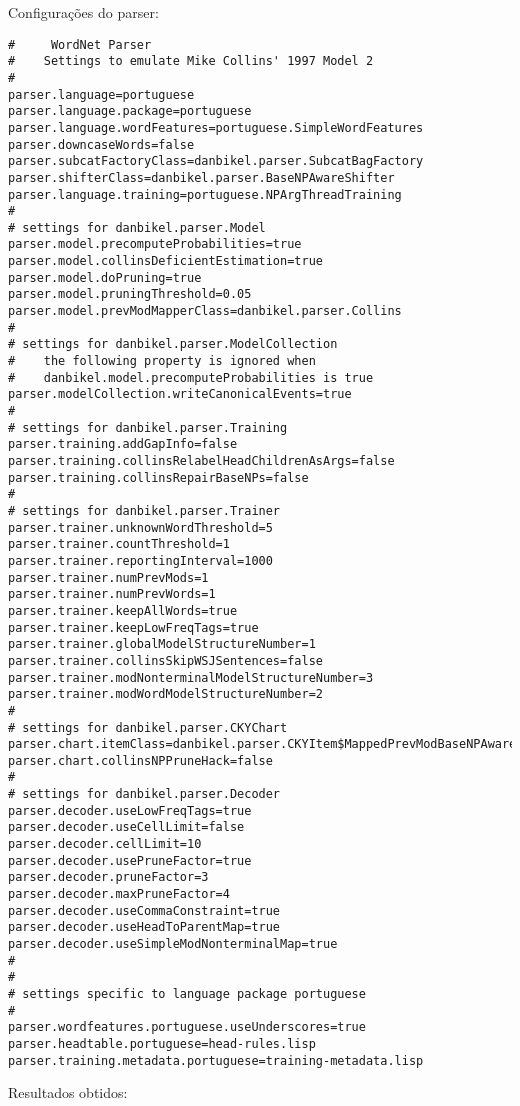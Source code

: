 \normalsize

Configurações do parser:

\scriptsize
\begin{verbatim}
#     WordNet Parser
#    Settings to emulate Mike Collins' 1997 Model 2
#
parser.language=portuguese
parser.language.package=portuguese
parser.language.wordFeatures=portuguese.SimpleWordFeatures
parser.downcaseWords=false
parser.subcatFactoryClass=danbikel.parser.SubcatBagFactory
parser.shifterClass=danbikel.parser.BaseNPAwareShifter
parser.language.training=portuguese.NPArgThreadTraining
#
# settings for danbikel.parser.Model
parser.model.precomputeProbabilities=true
parser.model.collinsDeficientEstimation=true
parser.model.doPruning=true
parser.model.pruningThreshold=0.05
parser.model.prevModMapperClass=danbikel.parser.Collins
#
# settings for danbikel.parser.ModelCollection
#    the following property is ignored when
#    danbikel.model.precomputeProbabilities is true
parser.modelCollection.writeCanonicalEvents=true
#
# settings for danbikel.parser.Training
parser.training.addGapInfo=false
parser.training.collinsRelabelHeadChildrenAsArgs=false
parser.training.collinsRepairBaseNPs=false
#
# settings for danbikel.parser.Trainer
parser.trainer.unknownWordThreshold=5
parser.trainer.countThreshold=1
parser.trainer.reportingInterval=1000
parser.trainer.numPrevMods=1
parser.trainer.numPrevWords=1
parser.trainer.keepAllWords=true
parser.trainer.keepLowFreqTags=true
parser.trainer.globalModelStructureNumber=1
parser.trainer.collinsSkipWSJSentences=false
parser.trainer.modNonterminalModelStructureNumber=3
parser.trainer.modWordModelStructureNumber=2
#
# settings for danbikel.parser.CKYChart
parser.chart.itemClass=danbikel.parser.CKYItem$MappedPrevModBaseNPAware
parser.chart.collinsNPPruneHack=false
#
# settings for danbikel.parser.Decoder
parser.decoder.useLowFreqTags=true
parser.decoder.useCellLimit=false
parser.decoder.cellLimit=10
parser.decoder.usePruneFactor=true
parser.decoder.pruneFactor=3
parser.decoder.maxPruneFactor=4
parser.decoder.useCommaConstraint=true
parser.decoder.useHeadToParentMap=true
parser.decoder.useSimpleModNonterminalMap=true
#
#
# settings specific to language package portuguese
#
parser.wordfeatures.portuguese.useUnderscores=true
parser.headtable.portuguese=head-rules.lisp
parser.training.metadata.portuguese=training-metadata.lisp
\end{verbatim}

\normalsize

Resultados obtidos:

